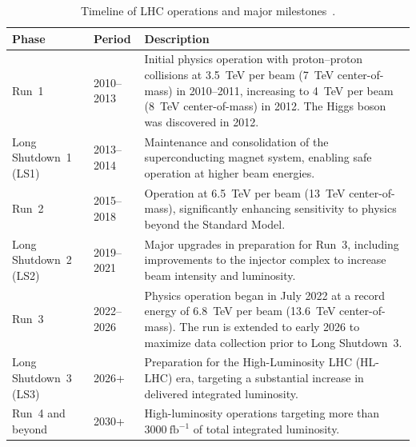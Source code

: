 \vspace*{0.5cm}
\begin{table}[htbp]
  \centering
  \caption{Timeline of LHC operations and major milestones~\cite{Apollinari:2015bam}.}
  \label{tab:lhc_timeline}
  \begin{tabular}{p{3.2cm} p{3.2cm} p{8.0cm}}
    \hline
    \textbf{Phase} & \textbf{Period} & \textbf{Description} \\
    \hline
    Run~1 & 2010--2013 &
    Initial physics operation with proton--proton collisions at 3.5~TeV per beam (7~TeV center-of-mass) in 2010--2011, increasing to 4~TeV per beam (8~TeV center-of-mass) in 2012. The Higgs boson was discovered in 2012. \\

    Long Shutdown~1 (LS1) & 2013--2014 &
    Maintenance and consolidation of the superconducting magnet system, enabling safe operation at higher beam energies. \\

    Run~2 & 2015--2018 &
    Operation at 6.5~TeV per beam (13~TeV center-of-mass), significantly enhancing sensitivity to physics beyond the Standard Model. \\

    Long Shutdown~2 (LS2) & 2019--2021 &
    Major upgrades in preparation for Run~3, including improvements to the injector complex to increase beam intensity and luminosity. \\

    Run~3 & 2022--2026 &
    Physics operation began in July 2022 at a record energy of 6.8~TeV per beam (13.6~TeV center-of-mass). The run is extended to early 2026 to maximize data collection prior to Long Shutdown~3. \\

    Long Shutdown~3 (LS3) & 2026+ &
    Preparation for the High-Luminosity LHC (HL-LHC) era, targeting a substantial increase in delivered integrated luminosity. \\

    Run~4 and beyond  & 2030+ &
    High-luminosity operations targeting more than $3000~\text{fb}^{-1}$ of total integrated luminosity. \\ 

    \hline
  \end{tabular}
\end{table}

